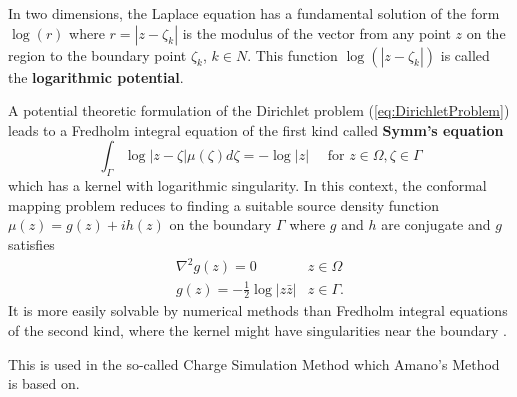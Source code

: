 \begin{definition}
    In two dimensions, the Laplace equation has a fundamental solution of the form $\log(r)$ where $r=|z-\zeta_k|$ is the modulus of the vector from any point $z$ on the region to the boundary point $\zeta_k$, $k\in N$. This function $\log(|z-\zeta_k|)$ is called the \textbf{logarithmic potential}. 
\end{definition}
A potential theoretic formulation of the Dirichlet problem (\ref{eq:DirichletProblem}) leads to a Fredholm integral equation of the first kind called \textbf{Symm's equation}
\begin{equation}\label{eq:Symm}
    \int_{\Gamma} \log| z - \zeta| \mu(\zeta) d\zeta = -\log|z| \quad \text{ for } z\in\Omega, \zeta\in\Gamma
\end{equation} which has a kernel with logarithmic singularity. In this context, the conformal mapping problem reduces to finding a suitable source density function $\mu(z)=g(z)+ih(z)$ on the boundary $\Gamma$ where $g$ and $h$ are conjugate and $g$ satisfies 
\begin{equation}
    \begin{matrix}
        \nabla^2 g(z) = 0 & z\in \Omega \\
        g(z) = -\frac{1}{2} \log|z\bar{z}| & z\in \Gamma.
    \end{matrix}
\end{equation}
It is more easily solvable by numerical methods than Fredholm integral equations of the second kind, where the kernel might have singularities near the boundary \cite[Chapter 9]{Kythe1998_symmsintegralequation}.

This is used in the so-called Charge Simulation Method which Amano's Method is based on.

